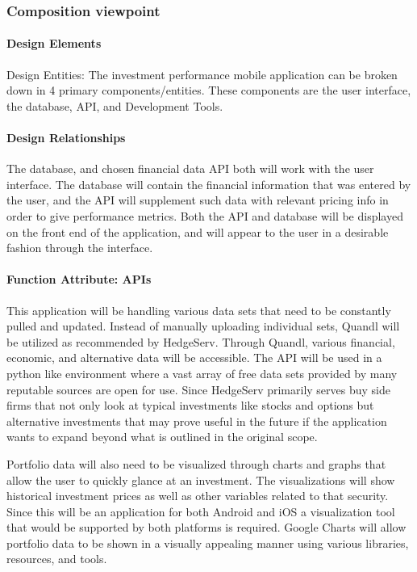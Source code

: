 \documentclass[onecolumn, draftclsnofoot,10pt, compsoc]{IEEEtran}
\begin{document}
\subsubsection{Composition viewpoint}
\paragraph{Design Elements}
        Design Entities: The investment performance mobile application can be broken down in 4 primary components/entities. These components are the user interface, the database, API, and Development Tools.

\paragraph{Design Relationships}
        The database, and chosen financial data API both will work with the user interface. The database will contain the financial information that was entered by the user, and the API will
        supplement such data with relevant pricing info in order to give performance metrics. Both the API and database will be displayed on the front end of the application, and will appear
        to the user in a desirable fashion through the interface.

\paragraph{Function Attribute: APIs}
        This application will be handling various data sets that need to be constantly pulled and updated. Instead of manually uploading individual sets, Quandl will be utilized as recommended by HedgeServ. Through Quandl,
	various financial, economic, and alternative data will be accessible. The API will be used in a python like environment where a vast array of free data sets provided by many reputable sources are open for use.
	Since HedgeServ primarily serves buy side firms that not only look at typical investments like stocks and options but alternative investments that may prove useful in the future if the application wants to expand
	beyond what is outlined in the original scope. 
        
        Portfolio data will also need to be visualized through charts and graphs that allow the user to quickly glance at an investment. The visualizations will show historical investment prices as well as other
	variables related to that security. Since this will be an application for both Android and iOS a visualization tool that would be supported by both platforms is required. Google Charts will allow portfolio data to
	be shown in a visually appealing manner using various libraries, resources, and tools. 
        
\end{document}
